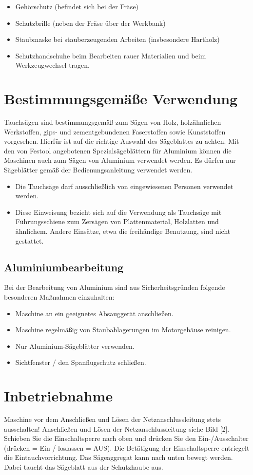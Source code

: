 \documentclass{\basedir/fablab-document}
\begin{document}
\begin{itemize}
\item Gehörschutz (befindet sich bei der Fräse)
\item Schutzbrille (neben der Fräse über der Werkbank)
\item Staubmaske bei stauberzeugenden Arbeiten (insbesondere Hartholz)
\item Schutzhandschuhe beim Bearbeiten rauer Materialien und beim Werkzeugwechsel tragen.
\end{itemize}

\section{Bestimmungsgemäße Verwendung}
Tauchsägen sind bestimmungsgemäß zum Sägen von Holz, holzähnlichen Werkstoffen, gips- und zementgebundenen Faserstoffen sowie Kunststoffen vorgesehen. Hierfür ist auf die richtige Auswahl des Sägeblattes zu achten. Mit den von Festool angebotenen Spezialsägeblättern für Aluminium können die Maschinen auch zum Sägen von Aluminium verwendet werden. Es dürfen nur Sägeblätter gemäß der Bedienungsanleitung verwendet werden.
\begin{itemize}
\item Die Tauchsäge darf ausschließlich von eingewiesenen Personen verwendet werden.
\item Diese Einweisung bezieht sich auf die Verwendung als Tauchsäge mit Führungsschiene zum Zersägen von Plattenmaterial, Holzlatten und ähnlichem. Andere Einsätze, etwa die freihändige Benutzung, sind nicht gestattet.
\end{itemize}

\subsection{Aluminiumbearbeitung}
Bei der Bearbeitung von Aluminium sind aus Sicherheitsgründen folgende besonderen Maßnahmen einzuhalten:
\begin{itemize}
\item Maschine an ein geeignetes Absauggerät anschließen.
\item Maschine regelmäßig von Staubablagerungen im Motorgehäuse reinigen.
\item Nur Aluminium-Sägeblätter verwenden.
\item Sichtfenster / den Spanflugschutz schließen.
\end{itemize}


\section{Inbetriebnahme}
Maschine vor dem Anschließen und Lösen der Netzanschlussleitung stets ausschalten! Anschließen und Lösen der Netzanschlussleitung siehe Bild [2].
Schieben Sie die Einschaltsperre nach oben und drücken Sie den Ein-/Ausschalter (drücken = Ein / loslassen = AUS).
Die Betätigung der Einschaltsperre entriegelt die Eintauchvorrichtung. Das Sägeaggregat kann nach unten bewegt werden. Dabei taucht das Sägeblatt aus der Schutzhaube aus.
\end{document}
